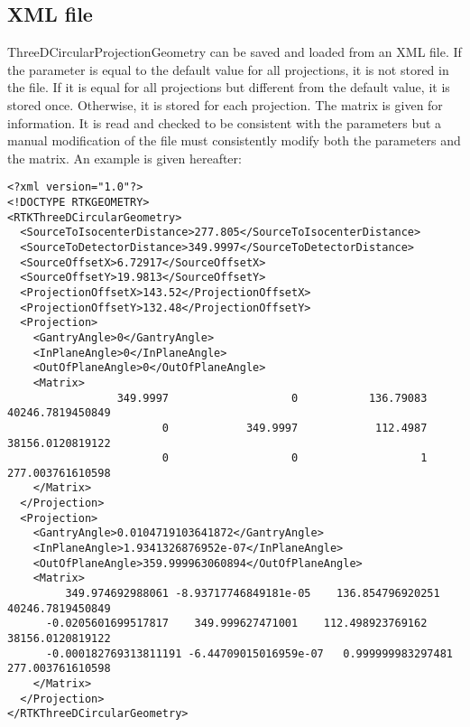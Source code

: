 \documentclass{article}
\begin{document}
\subsection{XML file}

ThreeDCircularProjectionGeometry can be saved and loaded from an XML file. If the parameter is equal to the default value for all projections, it is not stored in the file. If it is equal for all projections but different from the default value, it is stored once. Otherwise, it is stored for each projection. The matrix is given for information. It is read and checked to be consistent with the parameters but a manual modification of the file must consistently modify both the parameters and the matrix. An example is given hereafter:

\begin{verbatim}
<?xml version="1.0"?>
<!DOCTYPE RTKGEOMETRY>
<RTKThreeDCircularGeometry>
  <SourceToIsocenterDistance>277.805</SourceToIsocenterDistance>
  <SourceToDetectorDistance>349.9997</SourceToDetectorDistance>
  <SourceOffsetX>6.72917</SourceOffsetX>
  <SourceOffsetY>19.9813</SourceOffsetY>
  <ProjectionOffsetX>143.52</ProjectionOffsetX>
  <ProjectionOffsetY>132.48</ProjectionOffsetY>
  <Projection>
    <GantryAngle>0</GantryAngle>
    <InPlaneAngle>0</InPlaneAngle>
    <OutOfPlaneAngle>0</OutOfPlaneAngle>
    <Matrix>
                 349.9997                   0           136.79083    40246.7819450849
                        0            349.9997            112.4987    38156.0120819122
                        0                   0                   1    277.003761610598
    </Matrix>
  </Projection>
  <Projection>
    <GantryAngle>0.0104719103641872</GantryAngle>
    <InPlaneAngle>1.9341326876952e-07</InPlaneAngle>
    <OutOfPlaneAngle>359.999963060894</OutOfPlaneAngle>
    <Matrix>
         349.974692988061 -8.93717746849181e-05    136.854796920251    40246.7819450849
      -0.0205601699517817    349.999627471001    112.498923769162    38156.0120819122
      -0.000182769313811191 -6.44709015016959e-07   0.999999983297481    277.003761610598
    </Matrix>
  </Projection>
</RTKThreeDCircularGeometry>
\end{verbatim}
\end{document}
